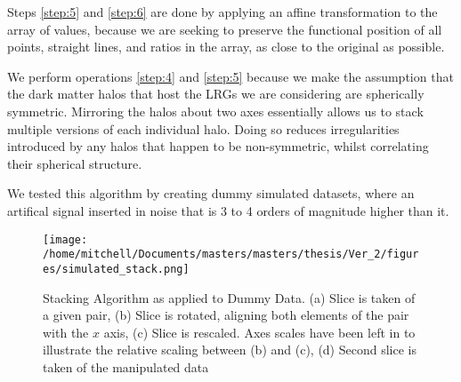 
Steps \ref{step:5} and \ref{step:6} are done by applying an affine transformation to the array of values, because we are seeking to preserve the functional position of all points, straight lines, and ratios in the array, as close to the original as possible. 




 

We perform operations \ref{step:4} and \ref{step:5} because we make the assumption that the dark matter halos that host the LRGs we are considering are spherically symmetric. Mirroring the halos about two axes essentially allows us to stack multiple versions of each individual halo. Doing so reduces irregularities introduced by any halos that happen to be non-symmetric, whilst correlating their spherical structure. 

We tested this algorithm by creating dummy simulated datasets, where an artifical signal inserted in noise that is 3 to 4 orders of magnitude higher than it. 

\begin{figure}[h!]
\centering
\texttt{[image: /home/mitchell/Documents/masters/masters/thesis/Ver\_2/figures/simulated\_stack.png]}
\caption{Stacking Algorithm as applied to Dummy Data. (a) Slice is taken of a given pair, (b) Slice is rotated, aligning both elements of the pair with the $x$ axis, (c) Slice is rescaled. Axes scales have been left in to illustrate the relative scaling between (b) and (c), (d) Second slice is taken of the manipulated data}
\end{figure}


